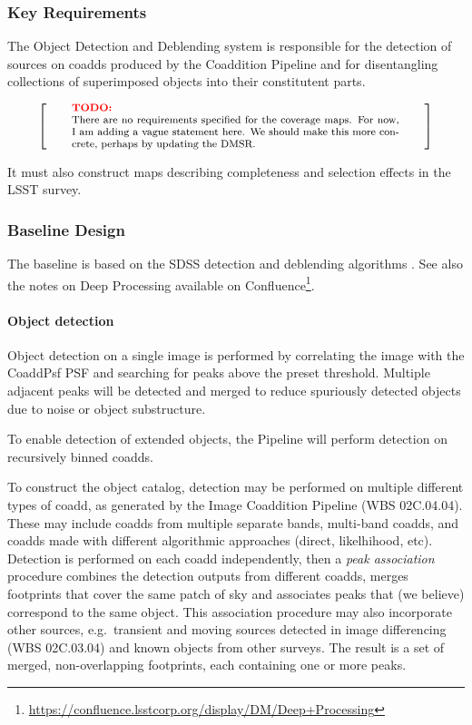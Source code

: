 \documentclass[12pt]{article}
\newcommand{\wbsDiffim}{WBS 02C.03.04}
\newcommand{\wbsCoadd}{WBS 02C.04.04}
\newenvironment{note}[1][Note]
{
  \begin{displaymath}
    \left[ \qquad
    \begin{minipage}[h]{.75\linewidth}
      \color{red} \footnotesize
      \textbf{#1:} \newline
      \color{black}
}
{
    \end{minipage}
    \normalsize
    \qquad \right]
  \end{displaymath}
}
\begin{document}
\subsubsection{Key Requirements}

The Object Detection and Deblending system is responsible for the detection of
sources on coadds produced by the Coaddition Pipeline and for disentangling
collections of superimposed objects into their constitutent parts.

\begin{note}[TODO]
There are no requirements specified for the coverage maps. For now, I am adding a vague statement here. We should make this more concrete, perhaps by updating the DMSR.
\end{note}

It must also construct maps describing completeness and selection effects in
the LSST survey.

\subsubsection{Baseline Design}

The baseline is based on the SDSS detection and deblending algorithms \cite{LuptonPhoto, Lupton05}. See also the notes on Deep Processing available on Confluence\footnote{\url{https://confluence.lsstcorp.org/display/DM/Deep+Processing}}.

\paragraph{Object detection}
\label{alg:detection}

Object detection on a single image is performed by correlating the image with the
CoaddPsf PSF and searching for peaks above the preset threshold. Multiple
adjacent peaks will be detected and merged to reduce spuriously detected
objects due to noise or object substructure.

To enable detection of extended objects, the Pipeline will perform detection on
recursively binned coadds.

To construct the object catalog, detection may be performed on multiple different types of coadd, as generated by the Image Coaddition Pipeline (\wbsCoadd{}). These may include coadds from multiple separate bands, multi-band coadds, and coadds made with different algorithmic approaches (direct, likelhihood, etc). Detection is performed on each coadd independently, then a \textit{peak association} procedure combines the detection outputs from different coadds, merges footprints that cover the same patch of sky and associates peaks that (we believe) correspond to the same object. This association procedure may also incorporate other sources, e.g.\ transient and moving sources detected in image differencing (\wbsDiffim{}) and known objects from other surveys. The result is a set of merged, non-overlapping footprints, each containing one or more peaks.
\end{document}
